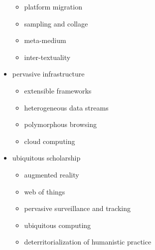 \begin{itemize}
\begin{itemize}
    \item	platform migration
    \item	sampling and collage
    \item	meta-medium
    \item	inter-textuality
  \end{itemize}
  \item pervasive infrastructure
  \begin{itemize}
    \item extensible frameworks
    \item	heterogeneous data streams
    \item	polymorphous browsing
    \item	cloud computing
  \end{itemize}
  \item ubiquitous scholarship
  \begin{itemize}
    \item augmented reality
    \item	web of things
    \item	pervasive surveillance and tracking
    \item	ubiquitous computing
    \item	deterritorialization of humanistic practice
  \end{itemize}
\end{itemize}